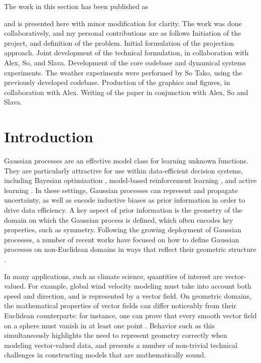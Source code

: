 The work in this section has been published as 


and is presented here with minor modification for clarity.
The work was done collaboratively, and my personal contributions are as follows \1 Initiation of the project, and definition of the problem.
\2 Initial formulation of the projection approach.
\3 Joint development of the technical formulation, in collaboration with Alex, So, and Slava.
\4 Development of the core codebase and dynamical systems experiments.
The weather experiments were performed by So Tako, using the previously developed codebase.
\5 Production of the graphics and figures, in collaboration with Alex.
\6 Writing of the paper in conjunction with Alex, So and Slava.
\0

\section{Introduction}

Gaussian processes are an effective model class for learning unknown functions.
They are particularly attractive for use within data-efficient decision systems, including Bayesian optimization \cite{Brochu2009, Osborne2009, Shahriari2016}, model-based reinforcement learning \cite{Rasmussen2004, Deisenroth2011c}, and active learning \cite{Krause2008}.
In these settings, Gaussian processes can represent and propagate uncertainty, as well as encode inductive biases as prior information in order to drive data efficiency.
A key aspect of prior information is the geometry of the domain on which the Gaussian process is defined, which often encodes key properties, such as symmetry.
Following the growing deployment of Gaussian processes, a number of recent works have focused on how to define Gaussian processes on non-Euclidean domains in ways that reflect their geometric structure \cite{Borovitskiy2020, Borovitskiy2021}.

In many applications, such as climate science, quantities of interest are vector-valued.
For example, global wind velocity modeling must take into account both speed and direction, and is represented by a vector field.
On geometric domains, the mathematical properties of vector fields can differ noticeably from their Euclidean counterparts: for instance, one can prove that every smooth vector field on a sphere must vanish in at least one point \cite{lee2013smooth}.
Behavior such as this simultaneously highlights the need to represent geometry correctly when modeling vector-valued data, and presents a number of non-trivial technical challenges in constructing models that are mathematically sound.

